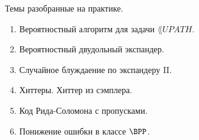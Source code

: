 \breakline

Темы разобранные на практике.
\begin{enumerate}
    \item Вероятностный алгоритм для задачи $\lang{UPATH}$.
    \item Вероятностный двудольный экспандер.
    \item Случайное блуждаение по экспандеру II.
    \item Хиттеры. Хиттер из сэмплера.
    \item Код Рида-Соломона с пропусками.
    \item Понижение ошибки в классе $\BPP$.
\end{enumerate}